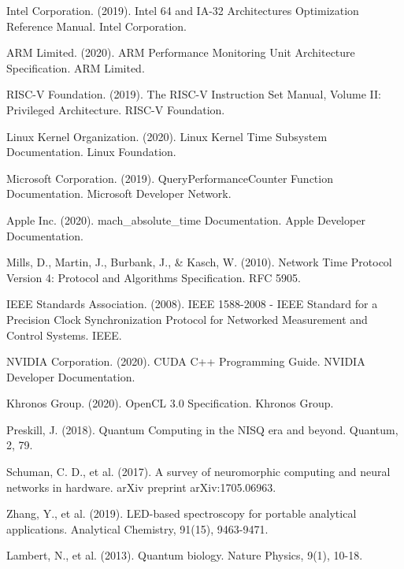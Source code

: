 \documentclass[12pt,a4paper]{article}
\begin{document}

\begin{thebibliography}{99}

Intel Corporation. (2019). Intel 64 and IA-32 Architectures Optimization Reference Manual. Intel Corporation.

ARM Limited. (2020). ARM Performance Monitoring Unit Architecture Specification. ARM Limited.

RISC-V Foundation. (2019). The RISC-V Instruction Set Manual, Volume II: Privileged Architecture. RISC-V Foundation.

Linux Kernel Organization. (2020). Linux Kernel Time Subsystem Documentation. Linux Foundation.

Microsoft Corporation. (2019). QueryPerformanceCounter Function Documentation. Microsoft Developer Network.

Apple Inc. (2020). mach\_absolute\_time Documentation. Apple Developer Documentation.

Mills, D., Martin, J., Burbank, J., \& Kasch, W. (2010). Network Time Protocol Version 4: Protocol and Algorithms Specification. RFC 5905.

IEEE Standards Association. (2008). IEEE 1588-2008 - IEEE Standard for a Precision Clock Synchronization Protocol for Networked Measurement and Control Systems. IEEE.

NVIDIA Corporation. (2020). CUDA C++ Programming Guide. NVIDIA Developer Documentation.

Khronos Group. (2020). OpenCL 3.0 Specification. Khronos Group.

Preskill, J. (2018). Quantum Computing in the NISQ era and beyond. Quantum, 2, 79.

Schuman, C. D., et al. (2017). A survey of neuromorphic computing and neural networks in hardware. arXiv preprint arXiv:1705.06963.

Zhang, Y., et al. (2019). LED-based spectroscopy for portable analytical applications. Analytical Chemistry, 91(15), 9463-9471.

Lambert, N., et al. (2013). Quantum biology. Nature Physics, 9(1), 10-18.


\end{thebibliography}
\end{document}
